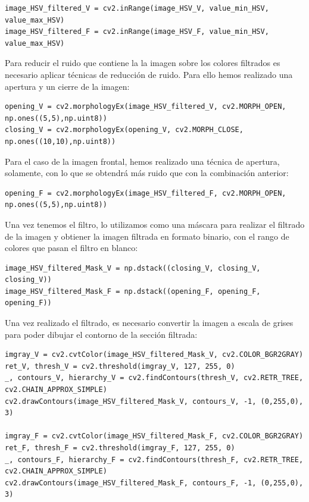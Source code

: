 \lstset{language=Python, breaklines=true, basicstyle=\footnotesize}
\begin{lstlisting}[frame=single]
image_HSV_filtered_V = cv2.inRange(image_HSV_V, value_min_HSV, value_max_HSV)
image_HSV_filtered_F = cv2.inRange(image_HSV_F, value_min_HSV, value_max_HSV)
\end{lstlisting}

Para reducir el ruido que contiene la la imagen sobre los colores filtrados es necesario aplicar técnicas de reducción de ruido. Para ello hemos realizado una apertura y un cierre de la imagen:

\lstset{language=Python, breaklines=true, basicstyle=\footnotesize}
\begin{lstlisting}[frame=single]
opening_V = cv2.morphologyEx(image_HSV_filtered_V, cv2.MORPH_OPEN, np.ones((5,5),np.uint8))
closing_V = cv2.morphologyEx(opening_V, cv2.MORPH_CLOSE, np.ones((10,10),np.uint8))
\end{lstlisting}

Para el caso de la imagen frontal, hemos realizado una técnica de apertura, solamente, con lo que se obtendrá más ruido que con la combinación anterior:

\lstset{language=Python, breaklines=true, basicstyle=\footnotesize}
\begin{lstlisting}[frame=single]
opening_F = cv2.morphologyEx(image_HSV_filtered_F, cv2.MORPH_OPEN, np.ones((5,5),np.uint8))
\end{lstlisting}

Una vez tenemos el filtro, lo utilizamos como una máscara para realizar el filtrado de la imagen y obtiener la imagen filtrada en formato binario, con el rango de colores que pasan el filtro en blanco:

\lstset{language=Python, breaklines=true, basicstyle=\footnotesize}
\begin{lstlisting}[frame=single]
image_HSV_filtered_Mask_V = np.dstack((closing_V, closing_V, closing_V))
image_HSV_filtered_Mask_F = np.dstack((opening_F, opening_F, opening_F))
\end{lstlisting}

Una vez realizado el filtrado, es necesario convertir la imagen a escala de grises para poder dibujar el contorno de la sección filtrada:

\lstset{language=Python, breaklines=true, basicstyle=\footnotesize}
\begin{lstlisting}[frame=single]
imgray_V = cv2.cvtColor(image_HSV_filtered_Mask_V, cv2.COLOR_BGR2GRAY)
ret_V, thresh_V = cv2.threshold(imgray_V, 127, 255, 0)
_, contours_V, hierarchy_V = cv2.findContours(thresh_V, cv2.RETR_TREE, cv2.CHAIN_APPROX_SIMPLE)
cv2.drawContours(image_HSV_filtered_Mask_V, contours_V, -1, (0,255,0), 3)

imgray_F = cv2.cvtColor(image_HSV_filtered_Mask_F, cv2.COLOR_BGR2GRAY)
ret_F, thresh_F = cv2.threshold(imgray_F, 127, 255, 0)
_, contours_F, hierarchy_F = cv2.findContours(thresh_F, cv2.RETR_TREE, cv2.CHAIN_APPROX_SIMPLE)
cv2.drawContours(image_HSV_filtered_Mask_F, contours_F, -1, (0,255,0), 3)
\end{lstlisting}

